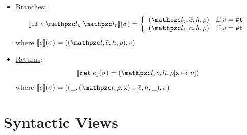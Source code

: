 \documentclass[10pt,conference]{IEEEtran}
\begin{document}
\begin{itemize}
  \item \underline{Branches}:
    \[
      \sem{\kwif \; \expr \; \lab_\vart \; \lab_\varf}(\st) =
      \left\{
        \begin{array}{ll}
          (\lab_\vart, \ctxts, \heap, \env) & \text{if} \; \val = \true\\
          (\lab_\varf, \ctxts, \heap, \env) & \text{if} \; \val = \false\\
        \end{array}
      \right.
    \]
    where $\sem{\expr}(\st) = ((\lab, \ctxts, \heap, \env), \val)$

  \item \underline{Returns}:
    \[
      \sem{\kwret \; \expr}(\st) = (\lab, \ctxts, \heap, \env[\varx \mapsto
      \val])
    \]
    where $\sem{\expr}(\st) = ((\_, (\lab, \env, \varx) :: \ctxts, \heap, \_),
    \val)$
\end{itemize}


\section{Syntactic Views}
\end{document}
